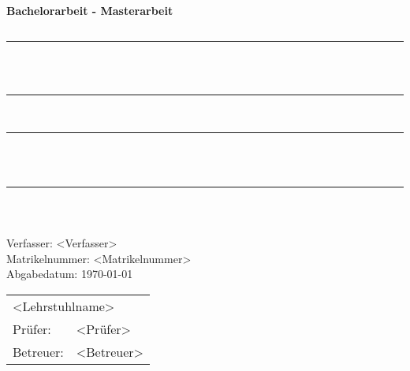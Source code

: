 \begin{titlepage}

	\newcommand{\HRule}{\rule{\linewidth}{1.5mm}}
	\begin{verbatim}
	


 
	
	
	\end{verbatim}
	\begin{center}
		\textbf{\LARGE{Bachelorarbeit - Masterarbeit}}\\
		\begin{verbatim}
		\end{verbatim}
		\HRule\\[0.4cm]
		
		{\LARGE\bfseries <Titel deutsch>}\\[0.2cm] %
		
		\HRule\\[0.5cm]
		\HRule\\[0.4cm]
		
		{\LARGE\bfseries <Title english>}\\[0.2cm] %
		
		\HRule\\[1.5cm]
	\end{center}
	
	\begin{verbatim}

	\end{verbatim}
    \begin{center}
		Verfasser: <Verfasser>\\
		Matrikelnummer: <Matrikelnummer>\\

		Abgabedatum: \today
		\\
		
		\vfill
		\begin{tabular}{ll}
			\multicolumn{2}{l}{<Lehrstuhlname>} \\
			Prüfer:     & <Prüfer> \\
			Betreuer:   & <Betreuer>
		\end{tabular}
	\end{center}



\end{titlepage}